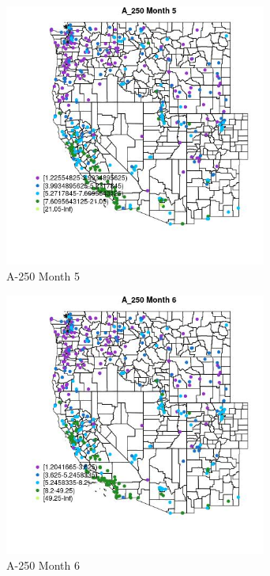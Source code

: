 \begin{figure} 
\centering  
\includegraphics[width=0.77\textwidth]{Code_Outputs/ML_input_report_ML_input_PM25_Step5_part_d_de_duplicated_aves_ML_input_MapObsMo5A_250.jpg} 
\caption{\label{fig:ML_input_report_ML_input_PM25_Step5_part_d_de_duplicated_aves_ML_inputMapObsMo5A_250}A-250 Month 5} 
\end{figure} 
 

\begin{figure} 
\centering  
\includegraphics[width=0.77\textwidth]{Code_Outputs/ML_input_report_ML_input_PM25_Step5_part_d_de_duplicated_aves_ML_input_MapObsMo6A_250.jpg} 
\caption{\label{fig:ML_input_report_ML_input_PM25_Step5_part_d_de_duplicated_aves_ML_inputMapObsMo6A_250}A-250 Month 6} 
\end{figure} 
 

